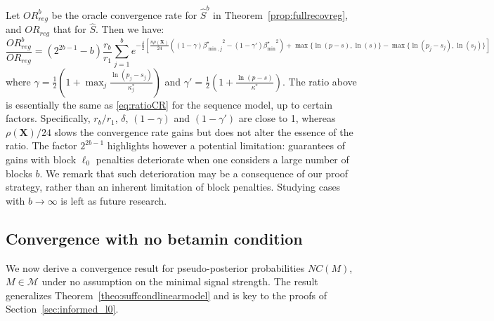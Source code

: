 \documentclass[aos]{imsart}
\theoremstyle{plain}
\newcommand{\bs}{\boldsymbol}
\begin{document}
Let ${OR}^b_{reg}$ be the oracle convergence rate for $\hat{S}^{b}$ in Theorem~\ref{prop:fullrecovreg}, and ${OR}_{reg}$ that for $\hat{S}$. Then we have:
\begin{equation*}
    \frac{{OR}^b_{reg}}{{OR}_{reg}}=(2^{2b-1}-b)\frac{r_b}{r_1}\sum_{j=1}^be^{-\frac{\delta}{2}\left[\frac{ n\rho(\bs X)}{24}\left((1-\gamma){\beta^\star_{\min,j}}^2-(1-\gamma'){\beta_{\min}^\star}^2\right)+\max\{\ln(p-s),\ln(s)\}-\max\{\ln(p_j-s_j),\ln(s_j)\}\right]}
\end{equation*}
where $\gamma=\frac12(1+\max_j\frac{\ln(p_j-s_j)}{\kappa_j^*})$ and $\gamma'=\frac12(1+\frac{\ln(p-s)}{\kappa^*})$. The ratio above is essentially the same as \eqref{eq:ratioCR} for the sequence model, up to certain factors.  Specifically, $r_b/r_1$, $\delta$, $(1-\gamma)$ and $(1-\gamma')$ are close to 1, whereas $ \rho(\bs X)/24$ slows the convergence rate gains but does not alter the essence of the ratio. %
The factor $2^{2b-1}$ highlights however a potential limitation: guarantees of gains with block $\ell_0$ penalties deteriorate when one considers a large number of blocks $b$.
We remark that such deterioration may be a consequence of our proof strategy, rather than an inherent limitation of block penalties. Studying cases with %
$b \to \infty$ is left as future research.

\subsection{Convergence with no betamin condition}\label{ssec:nobetaminhyp}

We now derive a convergence result for pseudo-posterior probabilities $NC(M)$, $M\in\mathcal{M}$ under no assumption on the minimal signal strength. The result generalizes Theorem~\ref{theo:suffcondlinearmodel} and is key to the proofs of Section~\ref{sec:informed_l0}.
\end{document}
